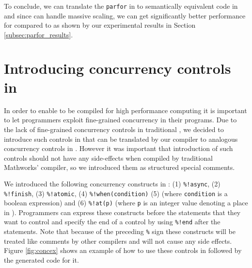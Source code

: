 To conclude, we can translate the \verb|parfor| in \matlab to
semantically equivalent code in \xten and since \xten can handle massive
scaling, we can get significantly better performance for \xten compared
to \matlab as shown by our experimental results in Section
\ref{subsec:parfor_results}.

\section{Introducing concurrency controls in \matlab}

In order to enable \matlab to be compiled for high performance computing
it is important to let programmers exploit fine-grained concurrency in
their \matlab programs. Due to the lack of fine-grained concurrency
controls in traditional \matlab, we decided to introduce such controls
in \matlab that can be translated by our \mixten compiler to analogous
concurrency controls in \xten. However it was important that
introduction of such controls should not have any side-effects when
compiled by traditional Mathworks' \matlab compiler, so we introduced
them as structured special comments. 

We introduced the following concurrency constructs in \matlab: (1)
\verb|%!async|, (2) \verb|%!finish|, (3) \verb|%!atomic|, (4)
\verb|%!when(condition)| (5) (where \verb|condition| is a boolean
expression) and (6) \verb|%!at(p)| (where \verb|p| is an integer value
denoting a place in \xten).  Programmers can express these constructs
before the statements that they want to control and specify the end of a
control by using \verb|%!end| after the statements. Note that because of
the preceding \verb|%| sign these constructs will be treated like
comments by other \matlab compilers and will not cause any side effects.
Figure \ref{fig:concex} 
shows an example of how to use these controls in
\matlab followed by the generated \xten code for it.   

